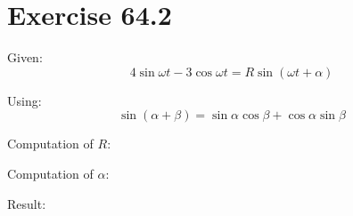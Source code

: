 \documentclass[a4paper, 10pt]{scrartcl}
\begin{document}
\section{Exercise 64.2}

Given:
\[4\sin{\omega t} - 3\cos{\omega t} = R\sin{(\omega t + \alpha)}\]

Using:
\[\sin{(\alpha + \beta)} = \sin{\alpha}\cos{\beta} + \cos{\alpha}\sin{\beta}\]

Computation of $R$:

Computation of $\alpha$:

Result:
\end{document}
